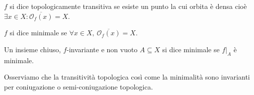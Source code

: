 \begin{definition}
	$ f $ si dice topologicamente transitiva se esiste un punto la cui orbita è densa cioè $ \exists x \in X : \overline{\mathcal{O}_f(x)} = X $.
\end{definition}

\begin{definition}
	$ f $ si dice minimale se $ \forall x \in X, \ \overline{\mathcal{O}_f(x)} = X $. 
\end{definition}

\begin{definition}
	Un insieme chiuso, $ f $-invariante e non vuoto $ A \subseteq X $ si dice minimale se $ f\lvert_A $ è minimale. 
\end{definition}

Osserviamo che la transitività topologica così come la minimalità sono invarianti per coniugazione o semi-coniugazione topologica.

